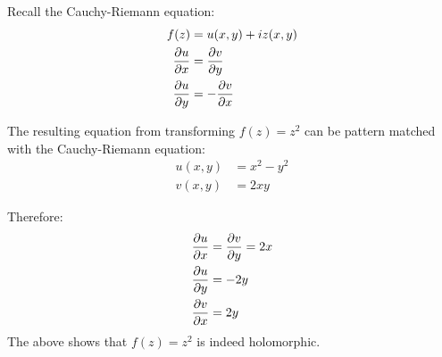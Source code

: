 \documentclass[12pt]{article}
\begin{document}
	Recall the Cauchy-Riemann equation:
	\begin{align*}
		f(z) &= u(x, y) + iz(x, y) \\
		\frac{\partial u}{\partial x} &= \frac{\partial v}{\partial y} \\
		\frac{\partial u}{\partial y} &= -\frac{\partial v}{\partial x}
	\end{align*}
	
	The resulting equation from transforming $f(z) = z^2$ can be pattern matched with the Cauchy-Riemann equation:
	\begin{align*}
		u(x, y) &= x^2 - y^2 \\
		v(x, y) &= 2xy
	\end{align*}
	
	Therefore:
	\begin{align*}
		\frac{\partial u}{\partial x} &= \frac{\partial v}{\partial y} = 2x \\
		\frac{\partial u}{\partial y} &= -2y \\
		\frac{\partial v}{\partial x} &= 2y
	\end{align*}
	The above shows that $f(z) = z^2$  is indeed holomorphic.
	
\end{document}
